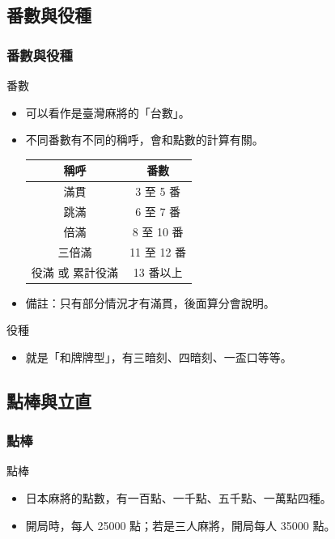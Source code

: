 \documentclass[utf8]{beamer}
\begin{document}
\begin{CJK}{UTF8}{bkai}
\subsection{番數與役種}
\begin{frame}
  \frametitle{番數與役種}
  \begin{exampleblock}{番數}
    \begin{itemize}
    \item 可以看作是臺灣麻將的「台數」。
    \item 不同番數有不同的稱呼，會和\alert{點數的計算}有關。
      \begin{table}
        \begin{tabular}{|c|c|}
        \hline
        稱呼 & 番數\\
        \hline
        \hline
        滿貫 & 3 至 5 番\\
        \hline
        跳滿 & 6 至 7 番\\
        \hline
        倍滿 & 8 至 10 番\\
        \hline
        三倍滿 & 11 至 12 番\\
        \hline
        役滿 或 累計役滿 & 13 番以上\\
        \hline
        \end{tabular}
      \end{table}
    \item 備註：只有\alert{部分}情況才有滿貫，後面算分會說明。
    \end{itemize}
  \end{exampleblock}
  \begin{alertblock}{役種}
    \begin{itemize}
    \item 就是「和牌牌型」，有三暗刻、四暗刻、一盃口等等。
    \end{itemize}
  \end{alertblock}
\end{frame}

\subsection{點棒與立直}

\begin{frame}
  \frametitle{點棒}
  \begin{block}{點棒}
    \begin{itemize}
    \item 日本麻將的點數，有一百點、一千點、五千點、一萬點四種。
    \item 開局時，每人 25000 點；若是三人麻將，開局每人 35000 點。
    \end{itemize}
  \end{block}
\end{frame}


\end{CJK}
\end{document}
